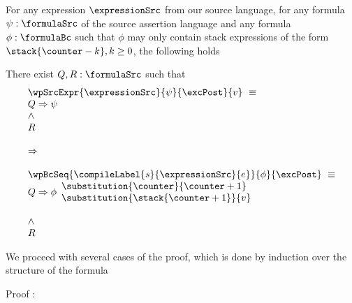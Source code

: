 \begin{exprSrcBcWp1} \label{exprValueOnStack}
 For any expression $\expressionSrc$ from our source language, for any formula $\psi: \formulaSrc$  
of the source assertion language and any formula $\phi: \formulaBc$ such that $\phi$ may only 
contain stack expressions of the form     $\stack{\counter - k}, k \ge 0$, the following holds



  There  exist $ Q, R : \formulaSrc$  such that 
$$ \begin{array}{l}
      \wpSrcExpr{\expressionSrc }{ \psi }{ \excPost}{v} \  \equiv \\ 
          Q \Rightarrow \psi \\
          \wedge \\ 
	  R  \\
  \\
\Rightarrow \\
 \\

  
	    \wpBcSeq{ \compileLabel{s}{\expressionSrc}{e} }{ \phi }{\excPost} \  \equiv \\ 
              Q \Rightarrow \phi \begin{array}{l}
                                       \substitution{\counter}{\counter + 1}\\
			               \substitution{\stack{\counter +1}}{ v }
                         \end{array} \\ \\
          \wedge \\ 
	  R 
  \end{array}$$




\end{exprSrcBcWp1}

We proceed with several cases of the proof, which is done by induction over the structure of the formula

Proof : 
 


